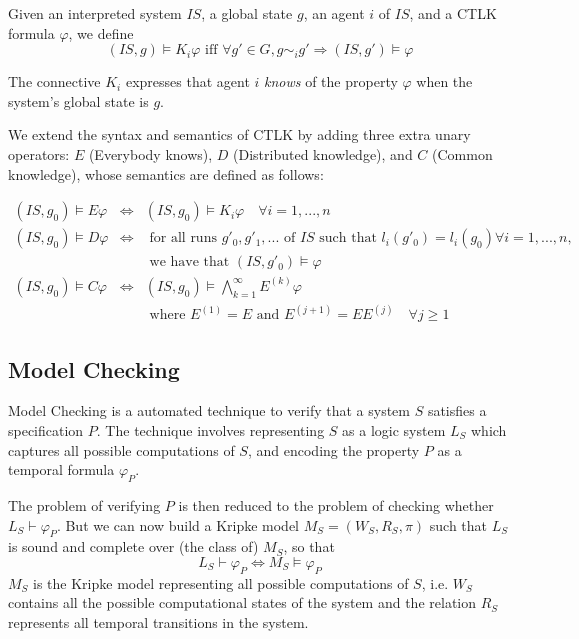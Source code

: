 \documentclass{article}
\newenvironment{definition}[1][Definition]{\begin{trivlist}
\item[\hskip \labelsep {\bfseries #1}]}{\end{trivlist}}
\begin{document}
\begin{definition}
Given an interpreted system $IS$, a global state $g$, an agent $i$ of $IS$, and a CTLK formula $\varphi$, we define
$$(IS, g) \models K_i \varphi \mbox{  iff  } \forall g' \in G, g \sim_i g' \Rightarrow (IS, g') \models \varphi$$

The connective $K_i$ expresses that agent $i$ \emph{knows} of the property $\varphi$ when the system's global state is $g$.

We extend the syntax and semantics of CTLK by adding three extra unary operators: $E$ (Everybody knows), $D$ (Distributed knowledge), and $C$ (Common knowledge), whose semantics are defined as follows:

\begin{eqnarray*}
(IS, g_0) \models E\varphi &\Leftrightarrow& (IS, g_0) \models K_i \varphi \quad \forall i = 1, ..., n \\
(IS, g_0) \models D\varphi &\Leftrightarrow& \mbox{ for all runs } g'_0, g'_1, ... \mbox{ of $IS$ such that } l_i(g'_0) = l_i(g_0) \forall i = 1, ..., n,\\ && \mbox{ we have that } (IS, g'_0) \models \varphi \\
(IS, g_0) \models C\varphi &\Leftrightarrow&  (IS, g_0) \models \bigwedge^\infty_{k = 1} E^{(k)}\varphi \quad \\&& \mbox{ where } E^{(1)} = E \mbox{ and } E^{(j+1)} = EE^{(j)} \quad \forall j \geq 1
\end{eqnarray*}
\end{definition}

\subsection{Model Checking} 

Model Checking is a automated technique to verify that a system $S$ satisfies a specification $P$. The technique involves representing $S$ as a logic system $L_S$ which captures all possible computations of $S$, and encoding the property $P$ as a temporal formula $\varphi_P$. 

The problem of verifying $P$ is then reduced to the problem of checking whether $L_S \vdash \varphi_P $. But we can now build a Kripke model $M_S = (W_S, R_S, \pi)$ such that $L_S$ is sound and complete over (the class of) $M_S$, so that $$L_S \vdash \varphi_P \Leftrightarrow M_S \models \varphi_P $$ 
$M_S$ is the Kripke model representing all possible computations of $S$, i.e. $W_S$ contains all the possible computational states of the system and the relation $R_S$ represents all temporal transitions in the system. 
\end{document}
